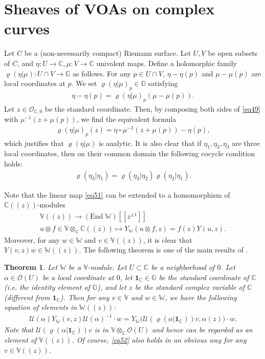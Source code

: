 \documentclass[12pt,b5paper,notitlepage]{report}
\theoremstyle{definition}
\theoremstyle{plain}
\newtheorem{thm}[df]{Theorem}
\newcommand{\mc}{\mathcal}
\newcommand{\id}{\mathbf{1}}
\newcommand{\scr}{\mathscr}
\newcommand{\mbb}{\mathbb}
\newcommand{\Vbb}{\mathbb V}
\newcommand{\Wbb}{\mathbb W}
\newcommand{\Gbb}{\mathbb G}
\newcommand{\Cbb}{\mathbb C}
\numberwithin{equation}{section}
\begin{document}
\section{Sheaves of VOAs on complex curves}\label{lb23}







Let $C$ be a (non-necessarily compact) Riemann surface. Let $U,V$ be open subsets of $C$, and  $\eta:U\rightarrow\Cbb,\mu:V\rightarrow\Cbb$ univalent maps.  Define a holomorphic family $\varrho(\eta|\mu):U\cap V\rightarrow\Gbb$  as follows. For any $p\in U\cap V$, $\eta-\eta(p)$ and $\mu-\mu(p)$ are local coordinates at $p$. We set $\varrho(\eta|\mu)_p\in\Gbb$ satisfying
\begin{align}
\eta-\eta(p)=\varrho(\eta|\mu)_p(\mu-\mu(p)).\label{eq49}
\end{align}
Let $z\in\scr O_{\Cbb,0}$ be the standard coordinate. Then, by composing both sides of \eqref{eq49} with $\mu^{-1}(z+\mu(p))$, we find the equivalent formula
\begin{align}
\varrho(\eta|\mu)_p(z)=\eta\circ\mu^{-1}(z+\mu(p))-\eta(p),
\end{align}
which justifies that $\varrho(\eta|\mu)$ is analytic. It is also clear that if $\eta_1,\eta_2,\eta_3$ are three local coordinates, then on their common domain the following cocycle condition holds:
\begin{align}
\varrho(\eta_3|\eta_1)=\varrho(\eta_3|\eta_2)\varrho(\eta_2|\eta_1).
\end{align}



Note that the linear map \eqref{eq51} can be extended to a homomorphism of $\Cbb((z))$-modules
\begin{gather}
\mbb V((z))\rightarrow(\text{End }\mbb W)[[z^{\pm1}]]\nonumber\\
u\otimes f\in \Vbb\otimes_{\Cbb}\Cbb((z))\mapsto Y_{\Wbb}(u\otimes f,z)=f(z)Y(u,z).\label{eq228}
\end{gather}
Moreover, for any $w\in\Wbb$ and $v\in\Vbb((z))$, it is clear that $Y(v,z)w\in\Wbb((z))$. The following theorem is one of the main results of \cite{Hua97}.

\begin{thm}\label{lb31}
Let $\Wbb$ be a $\Vbb$-module. Let $U\subset\Cbb$ be a neighborhood of $0$. Let $\alpha\in\scr O(U)$ be a local coordinate at $0$, let $\id_\Cbb\in\Gbb$ be the standard coordinate of $\Cbb$ (i.e.  the identity element of $\Gbb$), and let $z$ be the standard complex variable of $\Cbb$ (different from $\id_\Cbb$). Then for any $v\in\Vbb$ and $w\in\Wbb$, we have the following equation of elements in $\Wbb((z))$:
\begin{align}
\mc U(\alpha)Y_\Wbb(v,z)\mc U(\alpha)^{-1}\cdot w=Y_{\Wbb}\big(\mc U(\varrho(\alpha|\id_\Cbb))v,\alpha(z)\big)\cdot w.\label{eq52}
\end{align}
Note that $\mc U(\varrho(\alpha|\id_\Cbb))v$ is in $\Vbb\otimes_{\Cbb}\scr O(U)$ and hence can be regarded as an element of $\Vbb((z))$. Of course, \eqref{eq52} also holds in an obvious way for any $v\in\Vbb((z))$.
\end{thm}
\end{document}
